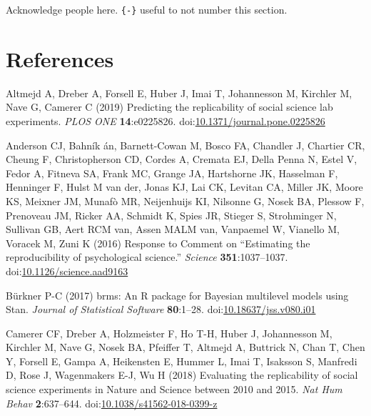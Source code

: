 \documentclass[
  english,
  a4paper,
]{article}
\newlength{\cslhangindent}
\newlength{\cslentryspacingunit} %
\newenvironment{CSLReferences}[2] %
 {%
  \setlength{\parindent}{0pt}
  \ifodd #1
  \let\oldpar\par
  \def\par{\hangindent=\cslhangindent\oldpar}
  \fi
  \setlength{\parskip}{#2\cslentryspacingunit}
 }%
 {}
\begin{document}
Acknowledge people here. \texttt{\{-\}} useful to not number this section.

\hypertarget{references}{%
\section*{References}\label{references}}

\hypertarget{refs}{}
\begin{CSLReferences}{1}{0}
\leavevmode{}%
Altmejd A, Dreber A, Forsell E, Huber J, Imai T, Johannesson M, Kirchler M, Nave G, Camerer C (2019) Predicting the replicability of social science lab experiments. \emph{PLOS ONE} \textbf{14}:e0225826. doi:\href{https://doi.org/10.1371/journal.pone.0225826}{10.1371/journal.pone.0225826}

\leavevmode{}%
Anderson CJ, Bahník án, Barnett-Cowan M, Bosco FA, Chandler J, Chartier CR, Cheung F, Christopherson CD, Cordes A, Cremata EJ, Della Penna N, Estel V, Fedor A, Fitneva SA, Frank MC, Grange JA, Hartshorne JK, Hasselman F, Henninger F, Hulst M van der, Jonas KJ, Lai CK, Levitan CA, Miller JK, Moore KS, Meixner JM, Munafò MR, Neijenhuijs KI, Nilsonne G, Nosek BA, Plessow F, Prenoveau JM, Ricker AA, Schmidt K, Spies JR, Stieger S, Strohminger N, Sullivan GB, Aert RCM van, Assen MALM van, Vanpaemel W, Vianello M, Voracek M, Zuni K (2016) Response to {Comment} on {``{Estimating} the reproducibility of psychological science.''} \emph{Science} \textbf{351}:1037--1037. doi:\href{https://doi.org/10.1126/science.aad9163}{10.1126/science.aad9163}

\leavevmode{}%
Bürkner P-C (2017) {brms}: An {R} package for {Bayesian} multilevel models using {Stan}. \emph{Journal of Statistical Software} \textbf{80}:1--28. doi:\href{https://doi.org/10.18637/jss.v080.i01}{10.18637/jss.v080.i01}

\leavevmode{}%
Camerer CF, Dreber A, Holzmeister F, Ho T-H, Huber J, Johannesson M, Kirchler M, Nave G, Nosek BA, Pfeiffer T, Altmejd A, Buttrick N, Chan T, Chen Y, Forsell E, Gampa A, Heikensten E, Hummer L, Imai T, Isaksson S, Manfredi D, Rose J, Wagenmakers E-J, Wu H (2018) Evaluating the replicability of social science experiments in {Nature} and {Science} between 2010 and 2015. \emph{Nat Hum Behav} \textbf{2}:637--644. doi:\href{https://doi.org/10.1038/s41562-018-0399-z}{10.1038/s41562-018-0399-z}


\end{CSLReferences}
\end{document}
